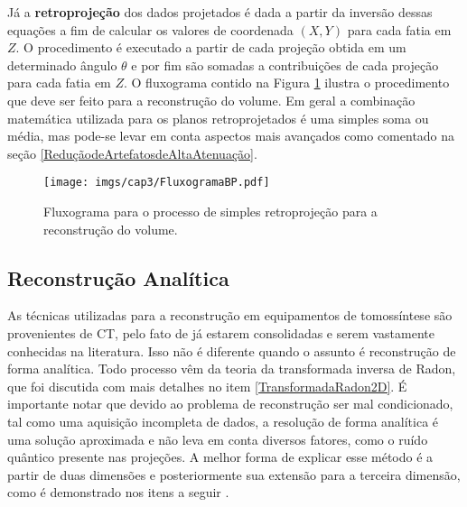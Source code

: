 Já a \textbf{retroprojeção} dos dados projetados é dada a partir da inversão dessas equações a fim de calcular os valores de  coordenada $(X,Y)$ para cada fatia em $Z$. O procedimento é executado a partir de cada projeção obtida em um determinado ângulo $\theta$ e por fim são somadas a contribuições de cada projeção para cada fatia em $Z$. O fluxograma contido na Figura \ref{fig:imgCap3FluxogramaBP} ilustra o procedimento que deve ser feito para a reconstrução do volume. Em geral a combinação matemática utilizada para os planos retroprojetados é uma simples soma ou média, mas pode-se levar em conta aspectos mais avançados como comentado na seção \ref{ReduçãodeArtefatosdeAltaAtenuação}.

\begin{figure}[H]
	\caption{Fluxograma para o processo de simples retroprojeção para a reconstrução do volume.}
	\begin{center}
		\texttt{[image: imgs/cap3/FluxogramaBP.pdf]}
	\end{center}
	\label{fig:imgCap3FluxogramaBP}
\end{figure}


\subsection{Reconstrução Analítica}

As técnicas utilizadas para a reconstrução em equipamentos de tomossíntese são provenientes de \acs{CT}, pelo fato de já estarem consolidadas e serem vastamente conhecidas na literatura. Isso não é diferente quando o assunto é reconstrução de forma analítica. Todo processo vêm da teoria da transformada inversa de Radon, que foi discutida com mais detalhes no item \ref{TransformadaRadon2D}. É importante notar que devido ao problema de reconstrução ser mal condicionado, tal como uma aquisição incompleta de dados, a resolução de forma analítica é uma solução aproximada e não leva em conta diversos fatores, como o ruído quântico presente nas projeções. A melhor forma de explicar esse método é a partir de duas dimensões e posteriormente sua extensão para a terceira dimensão, como é demonstrado nos itens a seguir \cite{mertelmeier2014filtered,xu2014tomographic}.  


